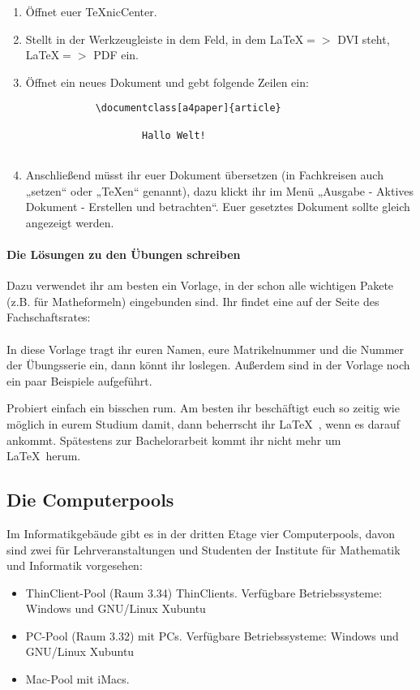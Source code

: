 \begin{enumerate}
 \item Öffnet euer \TeX nicCenter.
 \item Stellt in der Werkzeugleiste in dem Feld, in dem \LaTeX $=>$ DVI steht, \LaTeX $=>$ PDF ein.
 \item Öffnet ein neues Dokument und gebt folgende Zeilen ein:
    \begin{verbatim}
            \documentclass[a4paper]{article}
            
                    Hallo Welt!
            
    \end{verbatim}
 \item Anschließend müsst ihr euer Dokument übersetzen (in Fachkreisen auch „setzen“ oder „\TeX en“ genannt),
       dazu klickt ihr im Menü „Ausgabe - Aktives Dokument -
       Erstellen und betrachten“. Euer gesetztes Dokument sollte
       gleich angezeigt werden.
\end{enumerate}

\paragraph{Die Lösungen zu den Übungen schreiben}
Dazu verwendet ihr am besten ein Vorlage, in der schon alle wichtigen Pakete (z.B. für Matheformeln) eingebunden sind.
Ihr findet eine auf der Seite des Fachschaftsrates:\\
\\
In diese Vorlage tragt ihr euren Namen, eure Matrikelnummer und die Nummer der Übungsserie ein, dann könnt ihr loslegen.
Außerdem sind in der Vorlage noch ein paar Beispiele aufgeführt.

Probiert einfach ein bisschen rum.
Am besten ihr beschäftigt euch so zeitig wie möglich in eurem Studium damit, dann beherrscht ihr \LaTeX~, wenn es darauf ankommt.
Spätestens zur Bachelorarbeit kommt ihr nicht mehr um \LaTeX~herum.

\subsection{Die Computerpools}
Im Informatikgebäude gibt es in der dritten Etage vier Computerpools, davon sind zwei für Lehrveranstaltungen und Studenten der Institute für Mathematik und Informatik vorgesehen:

\begin{itemize}
    \item ThinClient-Pool (Raum 3.34) ThinClients.
          Verfügbare Betriebssysteme: Windows und GNU/Linux Xubuntu
    \item PC-Pool (Raum 3.32) mit PCs.
          Verfügbare Betriebssysteme: Windows und GNU/Linux Xubuntu 
    \item Mac-Pool mit iMacs.
\end{itemize}

